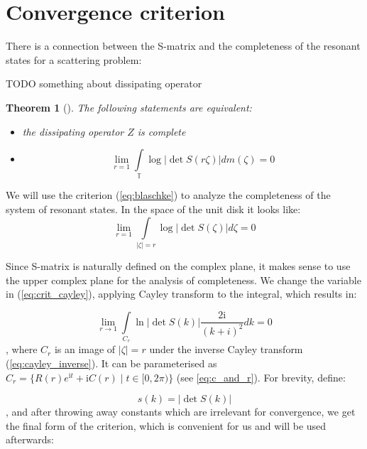 \documentclass{gCOV2e}
\theoremstyle{plain}%
\newtheorem{theorem}{Theorem}[section]
\theoremstyle{definition}
\theoremstyle{remark}
\begin{document}
\section{Convergence criterion}
There is a connection between the S-matrix and the completeness of the resonant states for a scattering problem:

TODO something about dissipating operator

\begin{theorem}[{\cite[p. 95, 99]{nikol2012treatise}}]
The following statements are equivalent:
\begin{itemize}
\item the dissipating operator $Z$ is complete
\item
\begin{equation}\label{eq:blaschke}
\lim\limits_{r = 1} \int\limits_{\mathbb{T}} \log \left|\det S(r \zeta)\right| d m(\zeta) = 0
\end{equation}
\end{itemize}
\end{theorem}

We will use the criterion (\ref{eq:blaschke}) to analyze the completeness of the system of resonant states. In the space of the unit disk it looks like:
\begin{equation}\label{eq:crit_cayley}
\lim\limits_{r = 1} \int\limits_{\left|\zeta\right| = r} \log \left|\det S(\zeta)\right| d \zeta = 0
\end{equation}

Since S-matrix is naturally defined on the complex plane, it makes sense to use the upper complex plane for the analysis of completeness. We change the variable in (\ref{eq:crit_cayley}), applying Cayley transform to the integral, which results in:

\begin{equation}\label{eq:crit}
\lim\limits_{r \to 1} \int\limits_{C_r} \ln \left|\det S(k)\right| \frac{2 \mathrm{i}}{(k + i)^2} dk = 0
\end{equation}
, where $C_r$ is an image of $\left|\zeta\right| = r$ under the inverse Cayley transform (\ref{eq:cayley_inverse}). It can be parameterised as $C_r = \{R(r) e^{\mathrm{i} t} + \mathrm{i} C(r) \mid t \in [0, 2 \pi)\}$ (see \ref{eq:c_and_r}). For brevity, define:

\[
s(k) = \left|\det S(k)\right|
\]
, and after throwing away constants which are irrelevant for convergence, we get the final form of the criterion, which is convenient for us and will be used afterwards:
\end{document}
